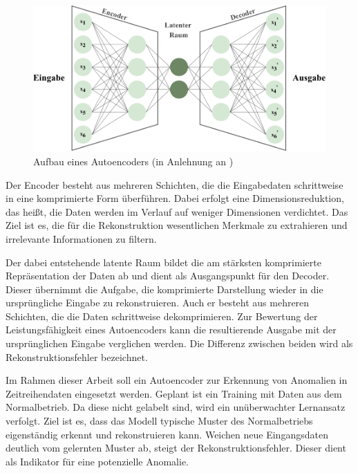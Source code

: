 \begin{figure}[htbp]
    \centering
    \includegraphics[width=1\textwidth]{Bilder/Autoencoder/AutoencoderModell.pdf}
    \caption[Aufbau eines Autoencoders]{Aufbau eines Autoencoders (in Anlehnung an \cite{AutoencoderBild})}
    \label{fig:Autoencoder}
\end{figure}

Der Encoder besteht aus mehreren Schichten, die die Eingabedaten schrittweise in eine komprimierte Form überführen. Dabei erfolgt eine Dimensionsreduktion, das heißt, die Daten werden im Verlauf auf weniger Dimensionen verdichtet. 
Das Ziel ist es, die für die Rekonstruktion wesentlichen Merkmale zu extrahieren und irrelevante Informationen zu filtern.

Der dabei entstehende latente Raum bildet die am stärksten komprimierte Repräsentation der Daten ab und dient als Ausgangspunkt für den Decoder.
Dieser übernimmt die Aufgabe, die komprimierte Darstellung wieder in die ursprüngliche Eingabe zu rekonstruieren. 
Auch er besteht aus mehreren Schichten, die die Daten schrittweise dekomprimieren.
Zur Bewertung der Leistungsfähigkeit eines Autoencoders kann die resultierende Ausgabe mit der ursprünglichen Eingabe verglichen werden. 
Die Differenz zwischen beiden wird als Rekonstruktionsfehler bezeichnet. \cite{Autoencoder}

Im Rahmen dieser Arbeit soll ein Autoencoder zur Erkennung von Anomalien in Zeitreihendaten eingesetzt werden. 
Geplant ist ein Training mit Daten aus dem Normalbetrieb. 
Da diese nicht gelabelt sind, wird ein unüberwachter Lernansatz verfolgt. 
Ziel ist es, dass das Modell typische Muster des Normalbetriebs eigenständig erkennt und rekonstruieren kann. 
Weichen neue Eingangsdaten deutlich vom gelernten Muster ab, steigt der Rekonstruktionsfehler.
Dieser dient als Indikator für eine potenzielle Anomalie.

